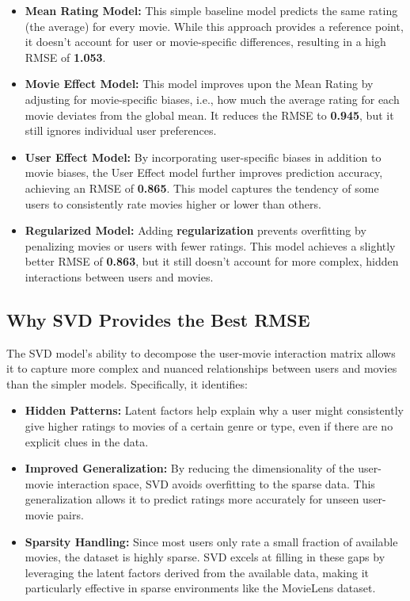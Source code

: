 \documentclass[
]{article}
\begin{document}
\begin{itemize}
\item
  \textbf{Mean Rating Model:} This simple baseline model predicts the
  same rating (the average) for every movie. While this approach
  provides a reference point, it doesn't account for user or
  movie-specific differences, resulting in a high RMSE of
  \textbf{1.053}.
\item
  \textbf{Movie Effect Model:} This model improves upon the Mean Rating
  by adjusting for movie-specific biases, i.e., how much the average
  rating for each movie deviates from the global mean. It reduces the
  RMSE to \textbf{0.945}, but it still ignores individual user
  preferences.
\item
  \textbf{User Effect Model:} By incorporating user-specific biases in
  addition to movie biases, the User Effect model further improves
  prediction accuracy, achieving an RMSE of \textbf{0.865}. This model
  captures the tendency of some users to consistently rate movies higher
  or lower than others.
\item
  \textbf{Regularized Model:} Adding \textbf{regularization} prevents
  overfitting by penalizing movies or users with fewer ratings. This
  model achieves a slightly better RMSE of \textbf{0.863}, but it still
  doesn't account for more complex, hidden interactions between users
  and movies.
\end{itemize}

\subsection{Why SVD Provides the Best
RMSE}\label{why-svd-provides-the-best-rmse}

The SVD model's ability to decompose the user-movie interaction matrix
allows it to capture more complex and nuanced relationships between
users and movies than the simpler models. Specifically, it identifies:

\begin{itemize}
\item
  \textbf{Hidden Patterns:} Latent factors help explain why a user might
  consistently give higher ratings to movies of a certain genre or type,
  even if there are no explicit clues in the data.
\item
  \textbf{Improved Generalization:} By reducing the dimensionality of
  the user-movie interaction space, SVD avoids overfitting to the sparse
  data. This generalization allows it to predict ratings more accurately
  for unseen user-movie pairs.
\item
  \textbf{Sparsity Handling:} Since most users only rate a small
  fraction of available movies, the dataset is highly sparse. SVD excels
  at filling in these gaps by leveraging the latent factors derived from
  the available data, making it particularly effective in sparse
  environments like the MovieLens dataset.
\end{itemize}
\end{document}
